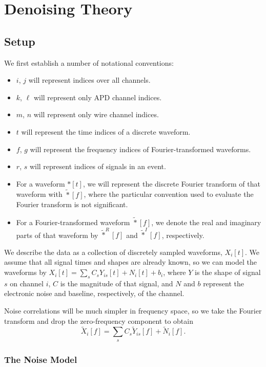 
\renewcommand{\thechapter}{2}
\chapter{Denoising Theory}

\section{Setup}

We first establish a number of notational conventions:
\begin{itemize}
\item $i$, $j$ will represent indices over all channels.
\item $k$, $\ell$ will represent only APD channel indices.
\item $m$, $n$ will represent only wire channel indices.
\item $t$ will represent the time indices of a discrete waveform.
\item $f$, $g$ will represent the frequency indices of Fourier-transformed waveforms.
\item $r$, $s$ will represent indices of signals in an event.
\item For a waveform $*[t]$, we will represent the discrete Fourier transform of that waveform with $\widetilde{*}[f]$, where the particular convention used to evaluate the Fourier transform is not significant.
\item For a Fourier-transformed waveform $\widetilde{*}[f]$, we denote the real and imaginary parts of that waveform by $\widetilde{*}^R[f]$ and $\widetilde{*}^I[f]$, respectively.
\end{itemize}

We describe the data as a collection of discretely sampled waveforms, $X_i[t]$.  We assume that all signal times and shapes are already known, so we can model the waveforms by $X_i[t] = \sum_s C_{s}Y_{is}[t] + N_i[t] + b_i$, where $Y$ is the shape of signal $s$ on channel $i$, $C$ is the magnitude of that signal, and $N$ and $b$ represent the electronic noise and baseline, respectively, of the channel.

Noise correlations will be much simpler in frequency space, so we take the Fourier transform and drop the zero-frequency component to obtain \[\widetilde{X}_i[f] = \sum_s C_{s}\widetilde{Y}_{is}[f] + \widetilde{N}_i[f].\]

\subsection{The Noise Model}

